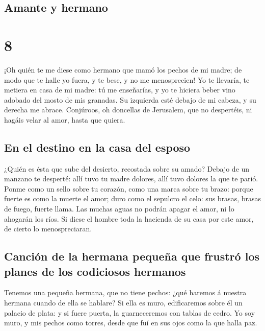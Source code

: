 \hypertarget{amante-y-hermano}{%
\subsection{Amante y hermano}\label{amante-y-hermano}}

\hypertarget{section-7}{%
\section{8}\label{section-7}}

 ¡Oh quién te me diese como hermano que mamó los pechos de
mi madre; de modo que te halle yo fuera, y te bese, y no me
menosprecien!  Yo te llevaría, te metiera en casa de mi
madre: tú me enseñarías, y yo te hiciera beber vino adobado del mosto de
mis granadas.  Su izquierda esté debajo de mi cabeza, y su
derecha me abrace.  Conjúroos, oh doncellas de Jerusalem,
que no despertéis, ni hagáis velar al amor, hasta que quiera.

\hypertarget{en-el-destino-en-la-casa-del-esposo}{%
\subsection{En el destino en la casa del
esposo}\label{en-el-destino-en-la-casa-del-esposo}}

 ¿Quién es ésta que sube del desierto, recostada sobre su
amado? Debajo de un manzano te desperté: allí tuvo tu madre dolores,
allí tuvo dolores la que te parió.  Ponme como un sello
sobre tu corazón, como una marca sobre tu brazo: porque fuerte es como
la muerte el amor; duro como el sepulcro el celo: sus brasas, brasas de
fuego, fuerte llama.  Las muchas aguas no podrán apagar el
amor, ni lo ahogarán los ríos. Si diese el hombre toda la hacienda de su
casa por este amor, de cierto lo menospreciaran.

\hypertarget{canciuxf3n-de-la-hermana-pequeuxf1a-que-frustruxf3-los-planes-de-los-codiciosos-hermanos}{%
\subsection{Canción de la hermana pequeña que frustró los planes de los
codiciosos
hermanos}\label{canciuxf3n-de-la-hermana-pequeuxf1a-que-frustruxf3-los-planes-de-los-codiciosos-hermanos}}

 Tenemos una pequeña hermana, que no tiene pechos: ¿qué
haremos á nuestra hermana cuando de ella se hablare?  Si
ella es muro, edificaremos sobre él un palacio de plata: y si fuere
puerta, la guarneceremos con tablas de cedro.  Yo soy
muro, y mis pechos como torres, desde que fuí en sus ojos como la que
halla paz.

